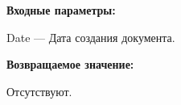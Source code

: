 \textbf{Входные параметры:}

Date --- Дата создания документа.

\textbf{Возвращаемое значение:}

Отсутствуют.